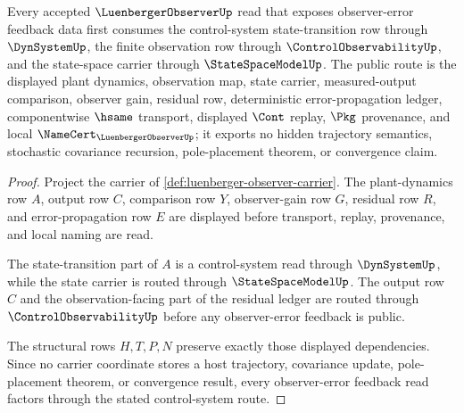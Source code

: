 \begin{theorem}
\label{thm:luenberger-observer-control-system-route}
Every accepted $\LuenbergerObserverUp$ read that exposes observer-error feedback data first consumes the control-system state-transition row through $\DynSystemUp$, the finite observation row through $\ControlObservabilityUp$, and the state-space carrier through $\StateSpaceModelUp$. The public route is the displayed plant dynamics, observation map, state carrier, measured-output comparison, observer gain, residual row, deterministic error-propagation ledger, componentwise $\hsame$ transport, displayed $\Cont$ replay, $\Pkg$ provenance, and local $\NameCert_{\LuenbergerObserverUp}$; it exports no hidden trajectory semantics, stochastic covariance recursion, pole-placement theorem, or convergence claim.
\end{theorem}
\begin{proof}
Project the carrier of \autoref{def:luenberger-observer-carrier}. The plant-dynamics row $A$, output row $C$, comparison row $Y$, observer-gain row $G$, residual row $R$, and error-propagation row $E$ are displayed before transport, replay, provenance, and local naming are read.

The state-transition part of $A$ is a control-system read through $\DynSystemUp$, while the state carrier is routed through $\StateSpaceModelUp$. The output row $C$ and the observation-facing part of the residual ledger are routed through $\ControlObservabilityUp$ before any observer-error feedback is public.

The structural rows $H,T,P,N$ preserve exactly those displayed dependencies. Since no carrier coordinate stores a host trajectory, covariance update, pole-placement theorem, or convergence result, every observer-error feedback read factors through the stated control-system route.
\end{proof}
